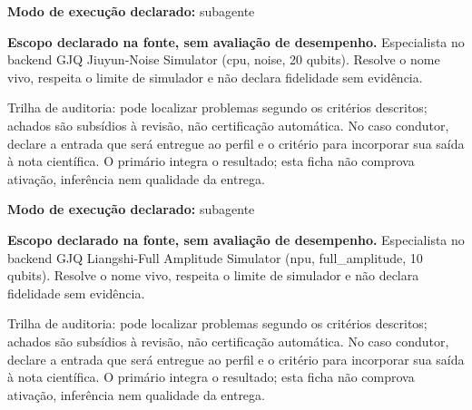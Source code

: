 \begin{arquitetura}
\textbf{Modo de execução declarado:} subagente
\end{arquitetura}


\begin{descricao}
\textbf{Escopo declarado na fonte, sem avaliação de desempenho.}
Especialista no backend GJQ Jiuyun-Noise Simulator (cpu, noise, 20 qubits). Resolve o nome vivo, respeita o limite de simulador e não declara fidelidade sem evidência.
\end{descricao}

\begin{funcao}
Trilha de auditoria: pode localizar problemas segundo os critérios descritos; achados são subsídios à revisão, não certificação automática. No caso condutor, declare a entrada que será entregue ao perfil e o critério para incorporar sua saída à nota científica. O primário integra o resultado; esta ficha não comprova ativação, inferência nem qualidade da entrega.
\end{funcao}

\begin{arquitetura}
\textbf{Modo de execução declarado:} subagente
\end{arquitetura}


\begin{descricao}
\textbf{Escopo declarado na fonte, sem avaliação de desempenho.}
Especialista no backend GJQ Liangshi-Full Amplitude Simulator (npu, full\_amplitude, 10 qubits). Resolve o nome vivo, respeita o limite de simulador e não declara fidelidade sem evidência.
\end{descricao}

\begin{funcao}
Trilha de auditoria: pode localizar problemas segundo os critérios descritos; achados são subsídios à revisão, não certificação automática. No caso condutor, declare a entrada que será entregue ao perfil e o critério para incorporar sua saída à nota científica. O primário integra o resultado; esta ficha não comprova ativação, inferência nem qualidade da entrega.
\end{funcao}

